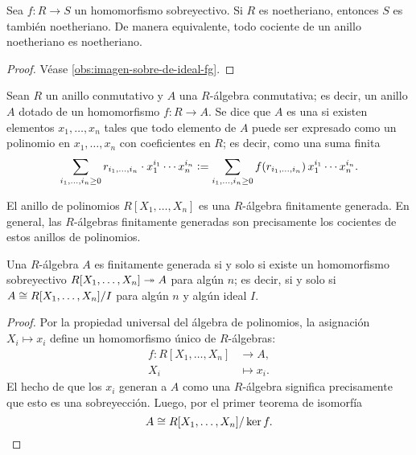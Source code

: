\begin{observacion}
  Sea $f\colon R\to S$ un homomorfismo sobreyectivo. Si $R$ es noetheriano,
  entonces $S$ es también noetheriano. De manera equivalente, todo cociente
  de un anillo noetheriano es noetheriano.

  \begin{proof}
    Véase \ref{obs:imagen-sobre-de-ideal-fg}.
  \end{proof}
\end{observacion}

\begin{definicion}
  Sean $R$ un anillo conmutativo y $A$ una $R$-álgebra conmutativa; es decir,
  un anillo $A$ dotado de un homomorfismo $f\colon R\to A$. Se dice que $A$
  es una  si existen elementos $x_1,\ldots,x_n$ tales que todo elemento
  de $A$ puede ser expresado como un polinomio en $x_1,\ldots,x_n$ con
  coeficientes en $R$; es decir, como una suma finita
  \[ \sum_{i_1,\ldots,i_n \ge 0} r_{i_1,\ldots,i_n}\cdot x_1^{i_1}\cdots x_n^{i_n} \mathrel{\mathop:}=
     \sum_{i_1,\ldots,i_n \ge 0} f(r_{i_1,\ldots,i_n})\,x_1^{i_1}\cdots x_n^{i_n}. \]
\end{definicion}

El anillo de polinomios $R [X_1,\ldots,X_n]$ es una $R$-álgebra finitamente
generada. En general, las $R$-álgebras finitamente generadas son precisamente
los cocientes de estos anillos de polinomios.

\begin{observacion}
  Una $R$-álgebra $A$ es finitamente generada si y solo si existe
  un homomorfismo sobreyectivo $R [X_1,\ldots,X_n] \twoheadrightarrow A$ para algún $n$;
  es decir, si y solo si $A \cong R [X_1,\ldots,X_n]/I$ para algún $n$ y algún
  ideal $I$.

  \begin{proof}
    Por la propiedad universal del álgebra de polinomios, la asignación
    $X_i \mapsto x_i$ define un homomorfismo único de $R$-álgebras:
    \begin{align*}
      f\colon R [X_1,\ldots,X_n] & \to A,\\
      X_i & \mapsto x_i.
    \end{align*}
    El hecho de que los $x_i$ generan a $A$ como una $R$-álgebra significa
    precisamente que esto es una sobreyección. Luego, por el primer teorema
    de isomorfía
    \[ A \cong R [X_1,\ldots,X_n]/\ker f. \qedhere \]
  \end{proof}
\end{observacion}


